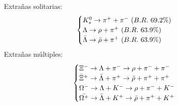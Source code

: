 \documentclass[letterpaper, 11pt]{article}
\begin{document}
\begin{multicols}{2}
Extrañas solitarias:
\begin{equation}
\begin{cases}
    K_{s}^{0} \rightarrow \pi^{+} + \pi^{-}\ (B.R.\ 69.2\%) \\
    \Lambda \rightarrow \rho + \pi^{+}\ (B.R.\ 63.9\%) \\
    \Bar{\Lambda} \rightarrow \Bar{\rho} + \pi^{+}\ ( B.R.\ 63.9\% )
\end{cases}
\end{equation}
Extrañas múltiples:
\begin{equation}
\begin{cases}
    \Xi^{-}\rightarrow \Lambda + \pi^{-} \rightarrow \rho + \pi^{-} + \pi^{-} \\
    \Bar{\Xi}^{+} \rightarrow \Bar{\Lambda} + \pi^{+} \rightarrow \Bar{\rho} + \pi^{+} + \pi^{+} \\
    \Omega^{-} \rightarrow \Lambda + K^{-} \rightarrow \rho + \pi^{-} + K^{-}\\
    \Bar{\Omega^{+}} \rightarrow \Bar{\Lambda} + K^{+} \rightarrow \Bar{\rho} + \pi^{+} + K^{+}

\end{cases}
\end{equation}


\end{multicols}
\end{document}
